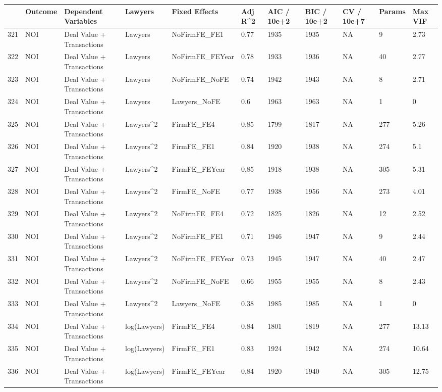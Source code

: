 \documentclass{article}
\begin{document}
\begin{table}[H]
\centering
\begin{tabular}{rllllllllll}
  \hline
 & Outcome & Dependent Variables & Lawyers & Fixed Effects & Adj R^2 & AIC / 10e+2 & BIC / 10e+2 & CV / 10e+7 & Params & Max VIF \\ 
  \hline
321 & NOI & Deal Value + Transactions & Lawyers & NoFirmFE\_FE1 & 0.77 & 1935 & 1935 & NA & 9 & 2.73 \\ 
  322 & NOI & Deal Value + Transactions & Lawyers & NoFirmFE\_FEYear & 0.78 & 1933 & 1936 & NA & 40 & 2.77 \\ 
  323 & NOI & Deal Value + Transactions & Lawyers & NoFirmFE\_NoFE & 0.74 & 1942 & 1943 & NA & 8 & 2.71 \\ 
  324 & NOI & Deal Value + Transactions & Lawyers & Lawyers\_NoFE & 0.6 & 1963 & 1963 & NA & 1 & 0 \\ 
  325 & NOI & Deal Value + Transactions & Lawyers^2 & FirmFE\_FE4 & 0.85 & 1799 & 1817 & NA & 277 & 5.26 \\ 
  326 & NOI & Deal Value + Transactions & Lawyers^2 & FirmFE\_FE1 & 0.84 & 1920 & 1938 & NA & 274 & 5.1 \\ 
  327 & NOI & Deal Value + Transactions & Lawyers^2 & FirmFE\_FEYear & 0.85 & 1918 & 1938 & NA & 305 & 5.31 \\ 
  328 & NOI & Deal Value + Transactions & Lawyers^2 & FirmFE\_NoFE & 0.77 & 1938 & 1956 & NA & 273 & 4.01 \\ 
  329 & NOI & Deal Value + Transactions & Lawyers^2 & NoFirmFE\_FE4 & 0.72 & 1825 & 1826 & NA & 12 & 2.52 \\ 
  330 & NOI & Deal Value + Transactions & Lawyers^2 & NoFirmFE\_FE1 & 0.71 & 1946 & 1947 & NA & 9 & 2.44 \\ 
  331 & NOI & Deal Value + Transactions & Lawyers^2 & NoFirmFE\_FEYear & 0.73 & 1945 & 1947 & NA & 40 & 2.47 \\ 
  332 & NOI & Deal Value + Transactions & Lawyers^2 & NoFirmFE\_NoFE & 0.66 & 1955 & 1955 & NA & 8 & 2.43 \\ 
  333 & NOI & Deal Value + Transactions & Lawyers^2 & Lawyers\_NoFE & 0.38 & 1985 & 1985 & NA & 1 & 0 \\ 
  334 & NOI & Deal Value + Transactions & log(Lawyers) & FirmFE\_FE4 & 0.84 & 1801 & 1819 & NA & 277 & 13.13 \\ 
  335 & NOI & Deal Value + Transactions & log(Lawyers) & FirmFE\_FE1 & 0.83 & 1924 & 1942 & NA & 274 & 10.64 \\ 
  336 & NOI & Deal Value + Transactions & log(Lawyers) & FirmFE\_FEYear & 0.84 & 1920 & 1940 & NA & 305 & 12.75 \\ 

\end{tabular}
\end{table}
\end{document}
